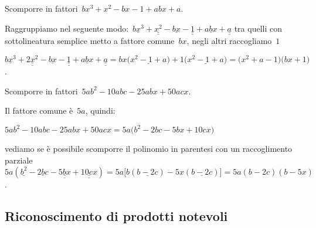  \begin{esempio}
Scomporre in fattori~\(bx^3+x^2-bx-1+abx+a\).
 \begin{enumeratea}
  \item Raggruppiamo nel seguente 
   modo:~\(\underline{bx^3}+\underline{\underline {x^2}}-\underline{bx}-
          \underline{\underline{1}}+\underline{abx}+\underline{\underline{a}}\) 
   tra quelli con sottolineatura semplice metto a fattore comune~\(bx\), 
   negli altri raccogliamo~\(1\)
  \item
   \(\underline{bx^3}+\underline{\underline {2x^2}}-\underline{bx}-
    \underline{\underline{1}}+\underline{abx}+\underline{\underline{a}}=
    bx\bigl(\underline{x^2-1+a}\bigr)+1\bigl(\underline{x^2-1+a}\bigr)=
    \bigl(x^2+a-1\bigr)\bigl(bx+1\bigr)\).
 \end{enumeratea}
 \end{esempio}

 \begin{esempio}
Scomporre in fattori~\(5ab^{2}-10abc-25abx+50acx\).
 \begin{enumeratea}
  \item Il fattore comune è~\(5a\), quindi:
    \begin{itemize*}
    \item \(5ab^{2}-10abc-25abx+50acx=5a\bigl(b^{2}-2bc-5bx+10cx\bigr)\)
    \end{itemize*}
  \item vediamo se è possibile scomporre il polinomio in parentesi con un 
   raccoglimento parziale~\(5a(\underline{b^{2}}-\underline{2bc}
     -\underline{\underline{5bx}}+\underline{\underline{10cx}})=
     5a\bigl[b(\underline{b-2c})-5x(\underline{b-2c})\bigr]=5a(b-2c)(b-5x)\).
 \end{enumeratea}
 \end{esempio}

% 


\subsection{Riconoscimento di prodotti notevoli}
\label{subsec:divpol_prodnot}

